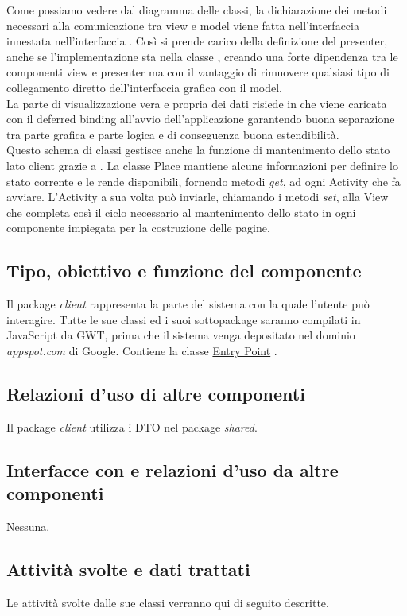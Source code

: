 Come possiamo vedere dal diagramma delle classi, la dichiarazione dei metodi
necessari alla comunicazione tra view e model viene fatta nell'interfaccia 
 innestata nell'interfaccia . Cos\`i 
si prende carico della definizione del presenter, anche se l'implementazione sta
nella classe , creando una forte dipendenza tra le componenti view e
presenter ma con il vantaggio di rimuovere qualsiasi tipo di collegamento
diretto dell'interfaccia grafica con il model.\\
La parte di visualizzazione vera e propria dei dati risiede in
 che viene caricata con il deferred binding all'avvio
dell'applicazione garantendo buona separazione tra parte grafica e parte logica
e di conseguenza buona estendibilit\`a.\\
Questo schema di classi gestisce
anche la funzione di mantenimento dello stato lato client grazie a
. La classe Place mantiene alcune informazioni per definire lo
stato corrente e le rende disponibili, fornendo metodi \emph{get}, ad ogni
Activity che fa avviare. L'Activity a sua volta pu\`o inviarle, chiamando i
metodi \emph{set}, alla View che completa cos\`i il ciclo necessario al
mantenimento dello stato in ogni componente impiegata per la costruzione delle pagine.

\subsection*{Tipo, obiettivo e funzione del componente} %
Il package \emph{client} rappresenta la parte del sistema con la quale l'utente
pu\`o interagire. Tutte le sue classi ed i suoi sottopackage saranno compilati in
JavaScript da GWT, prima che il sistema venga depositato nel dominio
\emph{appspot.com} di Google. Contiene la classe \underline{Entry Point}
.
\subsection*{Relazioni d'uso di altre componenti}
Il package \emph{client} utilizza i DTO nel package \emph{shared}.
\subsection*{Interfacce con e relazioni d'uso da altre componenti}
Nessuna.
\subsection*{Attivit\`a svolte e dati trattati}
Le attivit\`a svolte dalle sue classi verranno qui di seguito descritte.

